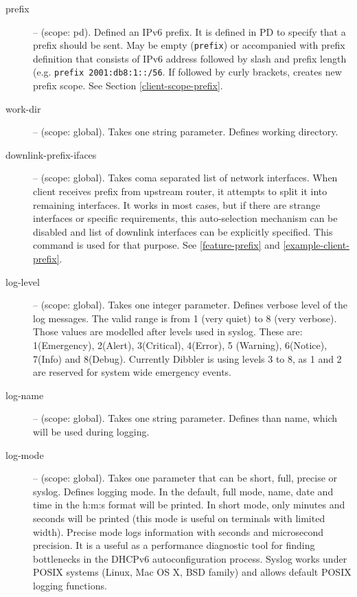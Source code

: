 \begin{description}
\item[prefix] -- (scope: pd). Defined an IPv6 prefix. It is defined in
PD to specify that a prefix should be sent. May be empty
(\verb+prefix+) or accompanied with prefix definition that consists of
IPv6 address followed by slash and prefix length (e.g.
\verb+prefix 2001:db8:1::/56+. If followed by curly brackets, creates
new prefix scope. See Section \ref{client-scope-prefix}.

\item[work-dir] -- (scope: global). Takes one string
 parameter. Defines working directory.

\item[downlink-prefix-ifaces] -- (scope: global). Takes coma separated
list of network interfaces. When client receives prefix from upstream
router, it attempts to split it into remaining interfaces. It works in
most cases, but if there are strange interfaces or specific
requirements, this auto-selection mechanism can be disabled and list
of downlink interfaces can be explicitly specified. This command is
used for that purpose. See \ref{feature-prefix} and
\ref{example-client-prefix}.

\item[log-level] -- (scope: global). Takes one integer
parameter. Defines verbose level of the log messages. The valid range
is from 1 (very quiet) to 8 (very verbose). Those values are modelled
after levels used in syslog. These are: 1(Emergency), 2(Alert),
3(Critical), 4(Error), 5 (Warning), 6(Notice), 7(Info) and
8(Debug). Currently Dibbler is using levels 3 to 8, as 1 and 2 are
reserved for system wide emergency events.

\item[log-name] -- (scope: global). Takes one string
parameter. Defines than name, which will be used during logging.

\item[log-mode] -- (scope: global). Takes one parameter that can be
   short, full, precise or syslog. Defines logging mode. In the
   default, full mode, name, date and time in the h:m:s format will be
   printed. In short mode, only minutes and seconds will be printed
   (this mode is useful on terminals with limited width). Precise mode
   logs information with seconds and microsecond precision. It is a
   useful as a performance diagnostic tool for finding bottlenecks in
   the DHCPv6 autoconfiguration process. Syslog works under POSIX
   systems (Linux, Mac OS X, BSD family) and allows default POSIX
   logging functions.


\end{description}

